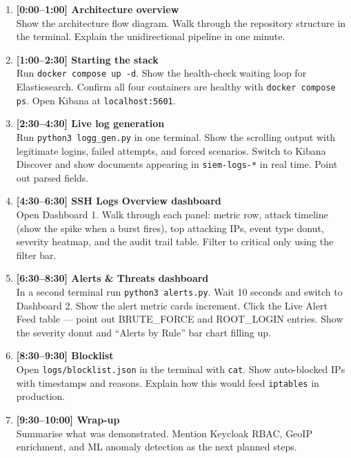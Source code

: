 \documentclass[12pt,a4paper]{article}
\newcommand{\file}[1]{\texttt{\color{accent}#1}}
\newcommand{\field}[1]{\texttt{#1}}
\begin{document}
\begin{enumerate}[leftmargin=2em]
  \item \textbf{[0:00--1:00] Architecture overview}\\
    Show the architecture flow diagram. Walk through the repository structure
    in the terminal. Explain the unidirectional pipeline in one minute.
  \item \textbf{[1:00--2:30] Starting the stack}\\
    Run \texttt{docker compose up -d}. Show the health-check waiting loop for
    Elasticsearch. Confirm all four containers are healthy with
    \texttt{docker compose ps}. Open Kibana at \texttt{localhost:5601}.
  \item \textbf{[2:30--4:30] Live log generation}\\
    Run \texttt{python3 logg\_gen.py} in one terminal. Show the scrolling
    output with legitimate logins, failed attempts, and forced scenarios.
    Switch to Kibana Discover and show documents appearing in
    \field{siem-logs-*} in real time. Point out parsed fields.
  \item \textbf{[4:30--6:30] SSH Logs Overview dashboard}\\
    Open Dashboard 1. Walk through each panel: metric row, attack timeline
    (show the spike when a burst fires), top attacking IPs, event type donut,
    severity heatmap, and the audit trail table. Filter to critical only using
    the filter bar.
  \item \textbf{[6:30--8:30] Alerts \& Threats dashboard}\\
    In a second terminal run \texttt{python3 alerts.py}. Wait 10 seconds and
    switch to Dashboard 2. Show the alert metric cards increment. Click the
    Live Alert Feed table — point out BRUTE\_FORCE and ROOT\_LOGIN entries.
    Show the severity donut and ``Alerts by Rule'' bar chart filling up.
  \item \textbf{[8:30--9:30] Blocklist}\\
    Open \file{logs/blocklist.json} in the terminal with \texttt{cat}.
    Show auto-blocked IPs with timestamps and reasons. Explain how this
    would feed \texttt{iptables} in production.
  \item \textbf{[9:30--10:00] Wrap-up}\\
    Summarise what was demonstrated. Mention Keycloak RBAC, GeoIP enrichment,
    and ML anomaly detection as the next planned steps.
\end{enumerate}
\end{document}
